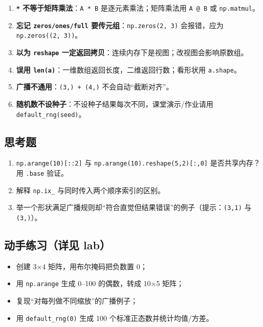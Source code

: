 \begin{enumerate}
\def\labelenumi{\arabic{enumi}.}
\tightlist
\item
  \textbf{\texttt{*} 不等于矩阵乘法}：\texttt{A\ *\ B}
  是逐元素乘法；矩阵乘法用 \texttt{A\ @\ B} 或 \texttt{np.matmul}。
\item
  \textbf{忘记 \texttt{zeros/ones/full}
  要传元组}：\texttt{np.zeros(2,\ 3)} 会报错，应为
  \texttt{np.zeros((2,\ 3))}。
\item
  \textbf{以为 \texttt{reshape}
  一定返回拷贝}：连续内存下是视图；改视图会影响原数组。
\item
  \textbf{误用
  \texttt{len(a)}}：一维数组返回长度，二维返回行数；看形状用
  \texttt{a.shape}。
\item
  \textbf{广播不通用}：\texttt{(3,)\ +\ (4,)} 不会自动``截断对齐''。
\item
  \textbf{随机数不设种子}：不设种子结果每次不同，课堂演示/作业请用
  \texttt{default\_rng(seed)}。
\end{enumerate}

\subsection{思考题}\label{ux601dux8003ux9898-3}

\begin{enumerate}
\def\labelenumi{\arabic{enumi}.}
\tightlist
\item
  \texttt{np.arange(10){[}::2{]}} 与
  \texttt{np.arange(10).reshape(5,2){[}:,0{]}} 是否共享内存？用
  \texttt{.base} 验证。
\item
  解释 \texttt{np.ix\_} 与同时传入两个顺序索引的区别。
\item
  举一个形状满足广播规则却``符合直觉但结果错误''的例子（提示：\texttt{(3,1)}
  与 \texttt{(3,)}）。
\end{enumerate}

\subsection{动手练习（详见
lab）}\label{ux52a8ux624bux7ec3ux4e60ux8be6ux89c1-lab}

\begin{itemize}
\tightlist
\item
  创建 3×4 矩阵，用布尔掩码把负数置 0；
\item
  用 \texttt{np.arange} 生成 0--100 的偶数，转成 10×5 矩阵；
\item
  复现``对每列做不同缩放''的广播例子；
\item
  用 \texttt{default\_rng(0)} 生成 100 个标准正态数并统计均值/方差。
\end{itemize}

